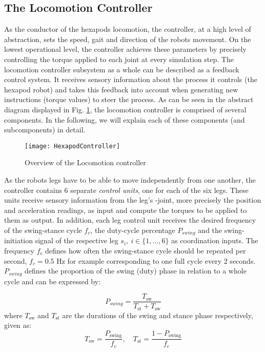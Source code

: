 \subsection{The Locomotion Controller} \label{subsec: Locomotion controller}
As the conductor of the hexapods locomotion, the controller, at a high level of abstraction, sets the speed, gait and direction of the robots movement.
On the lowest operational level, the controller achieves these parameters by precisely controlling the torque applied to each joint at every simulation step.
The locomotion controller subsystem as a whole can be described as a feedback control system.
It receives sensory information about the process it controls (the hexapod robot) and takes this feedback into account when generating new instructions (torque values) to steer the process.
As can be seen in the abstract diagram displayed in Fig. \ref{figure: Controller Overview}, the locomotion controller is comprised of several components. 
In the following, we will explain each of these components (and subcomponents) in detail.

\begin{figure}[h]
	\centerline{\texttt{[image: HexapodController]}}
	\caption[Controller Overview]{Overview of the Locomotion controller}
	\label{figure: Controller Overview}
\end{figure}

As the robots legs have to be able to move independently from one another, the controller contains 6 separate \textit{control units}, one for each of the six legs.
These units receive sensory information from the leg's \textalpha-joint, more precisely the position and acceleration readings, as input and compute the torques to be applied to them as output.
In addition, each leg control unit receives the desired frequency of the swing-stance cycle $f_{c}$, the duty-cycle percentage $P_{swing}$ and the swing-initiation signal of the respective leg $s_i,\ i \in \{1,...,6\}$ as coordination inputs.
The frequency $f_{c}$ defines how often the swing-stance cycle should be repeated per second, $f_{c} = 0.5 \text{ Hz}$ for example corresponding to one full cycle every 2 seconds.
$P_{swing}$ defines the proportion of the swing (duty) phase in relation to a whole cycle \parencite{qiu2023adaptive} and can be expressed by: 

\begin{equation}
P_{swing} = \frac{T_\text{sw}} {T_\text{st} + T_\text{sw}}
\end{equation}
where $T_\text{sw}$ and $T_\text{st}$ are the durations of the swing and stance phase respectively, given as:
\begin{equation}
T_\text{sw} = \frac{P_\text{swing}}{f_c}, \quad T_\text{st} = \frac{1-P_\text{swing}}{f_c}
\end{equation}

